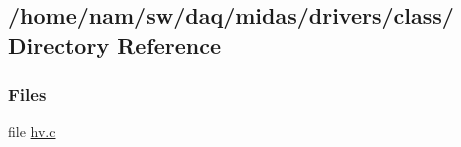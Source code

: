 \subsection{/home/nam/sw/daq/midas/drivers/class/ Directory Reference}
\label{dir_ac683fcc8bf5e14e49bc95edd965e9e1}
\subsubsection*{Files}
\begin{DoxyCompactItemize}
\item 
file \hyperlink{hv_8c}{hv.c}
\end{DoxyCompactItemize}
